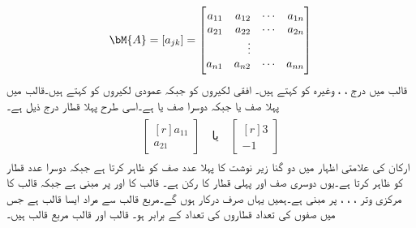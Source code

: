\begin{align}\label{مساوات_نظام_متعدد_جمع_متعدد_قالب}
\bM{A}=[a_{jk}]=
\begin{bmatrix*}[r]
a_{11} & a_{12} &\cdots & a_{1n}\\
a_{21} & a_{22}& \cdots & a_{2n}\\
& \vdots &  &\\
a_{n1} & a_{n2}& \cdots & a_{nn}
\end{bmatrix*}
\end{align}
قالب میں درج ، ،  وغیرہ کو  کہتے ہیں۔ افقی لکیروں کو  جبکہ عمودی لکیروں کو  کہتے ہیں۔قالب  میں پہلا صف  یا  جبکہ دوسرا صف  یا  ہے۔اسی طرح پہلا قطار درج ذیل ہے۔
\begin{gather*}
\begin{aligned}
\begin{bmatrix*}[r]
a_{11}\\
a_{21}
\end{bmatrix*}\quad \text{یا}\quad 
\begin{bmatrix*}[r]
3\\
-1
\end{bmatrix*}
\end{aligned}
\end{gather*}
ارکان کی علامتی اظہار میں دو گنا زیر نوشت کا پہلا عدد صف کو ظاہر کرتا ہے جبکہ دوسرا عدد قطار کو ظاہر کرتا ہے۔یوں  دوسری صف اور پہلی قطار کا رکن ہے۔ قالب  کا   اور  پر مبنی ہے جبکہ قالب  کا مرکزی وتر ، ، ،  پر مبنی ہے۔ہمیں یہاں صرف  درکار ہوں گے۔مربع قالب سے مراد ایسا قالب ہے جس میں صفوں کی تعداد قطاروں کی تعداد کے برابر ہو۔ قالب  اور قالب  مربع قالب ہیں۔

